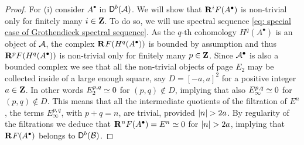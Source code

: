 \begin{proof}
    For (i) consider $A^\bullet$ in $\mathsf{D}^b(\mathcal A)$. We will show that $\mathbf{R}^{i}F(A^\bullet)$ is non-trivial only for finitely many $i \in \mathbf Z$. To do so, we will use spectral sequence \eqref{eq: special case of Grothendieck spectral sequence}. As the $q$-th cohomology $H^q(A^\bullet)$ is an object of $\mathcal A$, the complex $\mathbf{R}^{}F(H^q(A^\bullet))$ is bounded by assumption and thus $\mathbf{R}^{p}F(H^q(A^\bullet))$ is non-trivial only for finitely many $p \in \mathbf Z$. Since $\mathcal A^\bullet$ is also a bounded complex we see that all the non-trivial objects of page $E_2$ may be collected inside of a large enough square, 
    say $D = [-a, a]^2$ for a positive integer $a \in \mathbf Z$.
    In other words $E^{p,q}_2 \simeq 0$ for $(p,q) \notin D$, implying that also $E^{p,q}_\infty \simeq 0$ for $(p,q) \notin D$. This means that all the intermediate quotients of the filtration of $E^n$, \ie the terms $E^{p,q}_\infty$, with $p + q = n$, are trivial, provided $\left\lvert n \right\rvert > 2a$. By regularity of the filtrations we deduce that $\mathbf{R}^{n}F(A^\bullet) = E^n \simeq 0$ for $\left\lvert n \right\rvert > 2a$, implying that $\mathbf{R}^{}F(A^\bullet)$ belongs to $\mathsf{D}^b(\mathcal B)$.
    

\end{proof}

